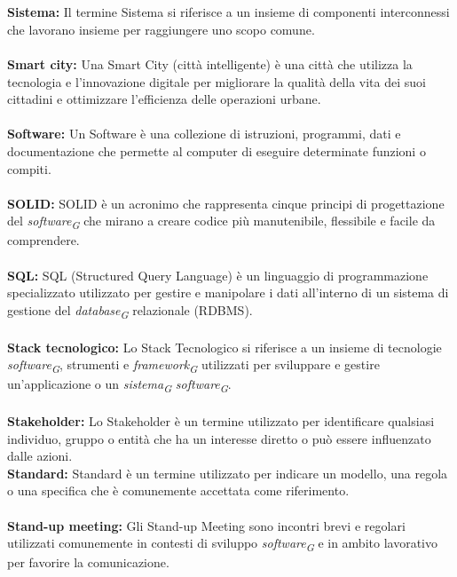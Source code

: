 \documentclass{article}
\begin{document}
\\
\\
\textbf{Sistema:} Il termine Sistema si riferisce a un insieme di componenti interconnessi che lavorano insieme per raggiungere uno scopo comune.
\\
\\
\textbf{Smart city:} Una Smart City (città intelligente) è una città che utilizza la tecnologia e l'innovazione digitale per migliorare la qualità della vita dei suoi cittadini e ottimizzare l'efficienza delle operazioni urbane.
\\
\\
\textbf{Software:} Un Software è una collezione di istruzioni, programmi, dati e documentazione che permette al computer di eseguire determinate funzioni o compiti.
\\
\\
\textbf{SOLID:} SOLID è un acronimo che rappresenta cinque principi di progettazione del \textit{software}\textsubscript{\textit{G}} che mirano a creare codice più manutenibile, flessibile e facile da comprendere.
\\
\\
\textbf{SQL:} SQL (Structured Query Language) è un linguaggio di programmazione specializzato utilizzato per gestire e manipolare i dati all'interno di un sistema di gestione del \textit{database}\textsubscript{\textit{G}} relazionale (RDBMS).
\\
\\
\textbf{Stack tecnologico:} Lo Stack Tecnologico si riferisce a un insieme di tecnologie \textit{software}\textsubscript{\textit{G}}, strumenti e \textit{framework}\textsubscript{\textit{G}} utilizzati per sviluppare e gestire un'applicazione o un \textit{sistema}\textsubscript{\textit{G}} \textit{software}\textsubscript{\textit{G}}.
\\
\\
\textbf{Stakeholder:} Lo Stakeholder è un termine utilizzato per identificare qualsiasi individuo, gruppo o entità che ha un interesse diretto o può essere influenzato dalle azioni.
\pagebreak
\\
\textbf{Standard:} Standard è un termine utilizzato per indicare un modello, una regola o una specifica che è comunemente accettata come riferimento.
\\
\\
\textbf{Stand-up meeting:} Gli Stand-up Meeting sono incontri brevi e regolari utilizzati comunemente in contesti di sviluppo \textit{software}\textsubscript{\textit{G}} e in ambito lavorativo per favorire la comunicazione.
\end{document}
